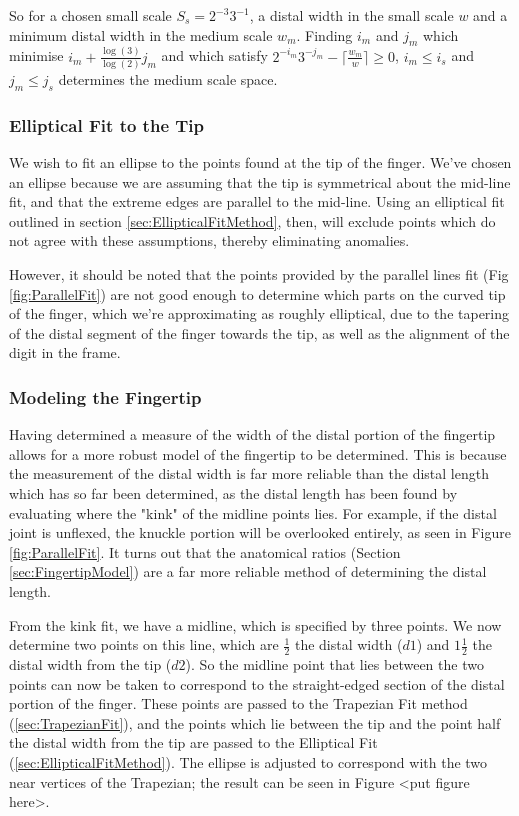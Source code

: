 So for a chosen small scale $S_s = 2^{-3} 3^{-1}$, a distal width in the small scale $w$ and a minimum distal width in the medium scale $w_m$. 
Finding  $i_m$ and $j_m$ which minimise $i_m + \frac{\log(3)}{\log(2)} j_m$  and which satisfy  $2^{-i_m} 3^{-j_m} - \lceil \frac{w_m}{w} \rceil \ge 0$, $i_m\le i_s$ and $j_m \le j_s$ determines the medium scale space.

\subsubsection{Elliptical Fit to the Tip}\label{sec:EllipticalFitToTheTip}

We wish to fit an ellipse to the points found at the tip of the finger. We've chosen an ellipse because we are assuming that the tip is symmetrical about the mid-line fit, and that the extreme edges are parallel to the mid-line. Using an elliptical fit outlined in section \ref{sec:EllipticalFitMethod}, then, will exclude points which do not agree with these assumptions, thereby eliminating anomalies.

However, it should be noted that the points provided by the parallel lines fit (Fig \ref{fig:ParallelFit}) are not good enough to determine which parts on the curved tip of the finger, which we're approximating as roughly elliptical, due to the tapering of the distal segment of the finger towards the tip, as well as the alignment of the digit in the frame.

\subsubsection{Modeling the Fingertip}\label{sec:ModellingTheFingertip}
Having determined a measure of the width of the distal portion of the fingertip allows for a more robust model of the fingertip to be determined. This is because the measurement of the distal width is far more reliable than the distal length which has so far been determined, as the distal length has been found by evaluating where the "kink" of the midline points lies. For example, if the distal joint is unflexed, the knuckle portion will be overlooked entirely, as seen in Figure \ref{fig:ParallelFit}. It turns out that the anatomical ratios (Section \ref{sec:FingertipModel}) are a far more reliable method of determining the distal length.

From the kink fit, we have a midline, which is specified by three points. We now determine two points on this line, which are $\frac{1}{2}$ the distal width ($d1$) and $1\frac{1}{2}$ the distal width from the tip ($d2$). So the midline point that lies between the two points can now be taken to correspond to the straight-edged section of the distal portion of the finger. These points are passed to the Trapezian Fit method (\ref{sec:TrapezianFit}), and the points which lie between the tip and the point half the distal width from the tip are passed to the Elliptical Fit (\ref{sec:EllipticalFitMethod}). The ellipse is adjusted to correspond with the two near vertices of the Trapezian; the result can be seen in Figure <put figure here>.


